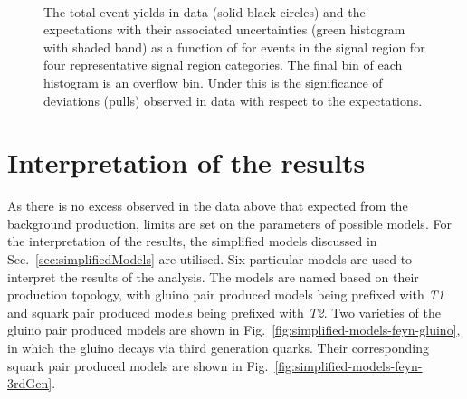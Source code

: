 \begin{figure}[!tbhp]
\begin{center}
{    }~~
  \end{center}
  \caption{The total event yields in data (solid black circles) and
  the \SM expectations with their associated uncertainties (green
  histogram with shaded band) as a function of \MHT for events in the
  signal region for four representative signal region categories. The
  final bin of each histogram is an overflow bin. Under this is the
  significance of deviations (pulls) observed in data with respect to
  the \SM expectations. \label{fig:mht-templates} 
  }
\end{figure}


\section{Interpretation of the results}
\label{sec:signalModel}

As there is no excess observed in the data above that expected from
the \SM background production, limits are set on the parameters of
possible \SUSY models. For the interpretation of the results, the
simplified models discussed in Sec.~\ref{sec:simplifiedModels} are
utilised. Six particular models are used to interpret the results of
the analysis. The models are named based on their production topology,
with gluino pair produced models being prefixed with \emph{T1} and
squark pair produced models being prefixed with \emph{T2}. Two
varieties of the gluino pair produced models are shown in
Fig.~\ref{fig:simplified-models-feyn-gluino}, in which the gluino
decays via third generation quarks. Their corresponding squark pair
produced models are shown in
Fig.~\ref{fig:simplified-models-feyn-3rdGen}.  

